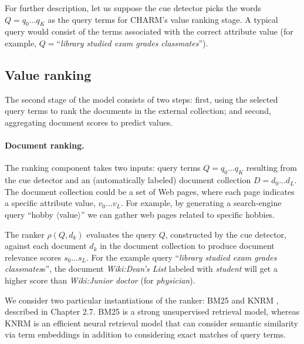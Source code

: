 For further description, let us suppose the cue detector picks the words $Q = q_0 ... q_K$ as the query terms for CHARM's value ranking stage. A typical query would consist of the terms associated with the correct attribute value (for example, $Q=$``\textit{library studied exam grades classmates}'').

\subsection{Value ranking}
The second stage of the model consists of two steps: first, using the selected query terms to rank the documents in the external collection; and second, aggregating document scores to predict values.

\paragraph{Document ranking.}
The ranking component takes two inputs: query terms $Q = q_0 ... q_K$ resulting from the cue detector and an (automatically labeled) document collection $D = d_0 ... d_L$.
The document collection
could be a set
of Web pages, where each page indicates a specific attribute value, $v_0 ... v_L$. 
For example, by 
generating a search-engine query ``hobby $\langle$value$\rangle$'' we can gather 
web pages related to specific hobbies. 

The ranker $\rho (Q, d_k)$ evaluates the query $Q$,
constructed by the cue detector,
against each document $d_k$ in the document collection to produce document relevance scores $s_0 ... s_L$. For the example query ``\textit{library studied exam grades classmates}s'', the document \emph{Wiki:Dean's List} labeled with \emph{student} will get a higher score than \emph{Wiki:Junior doctor} (for \emph{physician}). 

We consider two particular instantiations of the ranker:
BM25 \cite{robertson1995okapi} and KNRM \cite{xiong2017end}, described in Chapter 2.7.
BM25 is a strong unsupervised retrieval model, whereas KNRM is an efficient neural retrieval model that can consider semantic similarity via term embeddings in addition to considering exact matches of query terms. 

